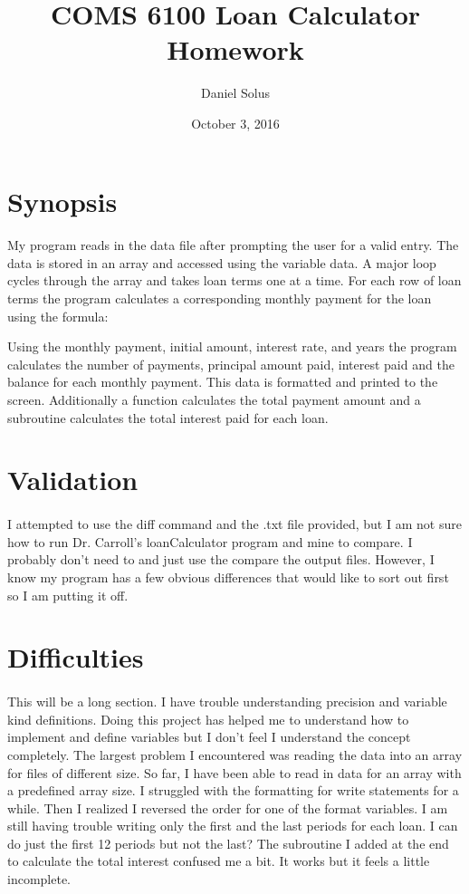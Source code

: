\documentclass[11pt]{article}
\title{COMS 6100 Loan Calculator Homework}
\author{Daniel Solus}
\date{October 3, 2016}
\begin{document}
\maketitle

\section{Synopsis}
\paragraph{} My program reads in the data file after prompting the user for a valid entry. The data is stored in an array and accessed using the variable data. A major loop cycles through the array and takes loan terms one at a time. For each row of loan terms the program calculates a corresponding monthly payment for the loan using the formula:


Using the monthly payment, initial amount, interest rate, and years the program calculates the number of payments, principal amount paid, interest paid and the balance for each monthly payment. This data is formatted  and printed to the screen. Additionally a function calculates the total payment amount and a subroutine calculates the total interest paid for each loan.

\section{Validation}
\paragraph{} I attempted to use the diff command and the .txt file provided, but I am not sure how to run Dr. Carroll's loanCalculator program and mine to compare. I probably don't need to and just use the compare the output files. However, I know my program has a few obvious differences that would like to sort out first so I am putting it off.

\section{Difficulties}
\paragraph{} This will be a long section. I have trouble understanding precision and variable kind definitions. Doing this project has helped me to understand how to implement and define variables but I don't feel I understand the concept completely. The largest problem I encountered was reading the data into an array for files of different size. So far, I have been able to read in data for an array with a predefined array size. I struggled with the formatting for write statements for a while. Then I realized I reversed the order for one of the format variables. I am still having trouble writing only the first and the last periods for each loan. I can do just the first 12 periods but not the last? The subroutine I added at the end to calculate the total interest confused me a bit. It works but it feels a little incomplete.
\end{document}
